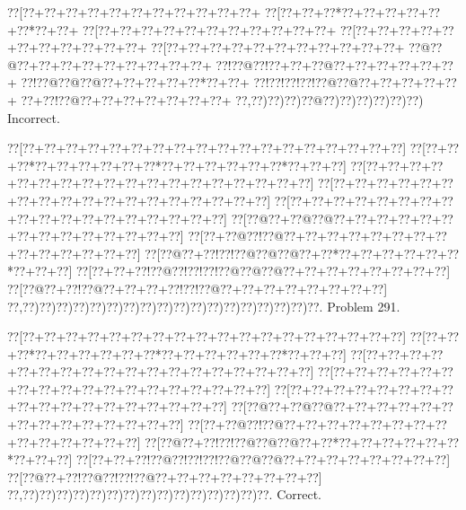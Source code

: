 \documentclass[a5paper]{article}
\begin{document}
\begin{center}
{\goo
\0??[\0??+\0??+\0??+\0??+\0??+\0??+\0??+\0??+\0??+\0??+\0??+
\0??[\0??+\0??+\0??*\0??+\0??+\0??+\0??+\0??+\0??*\0??+\0??+
\0??[\0??+\0??+\0??+\0??+\0??+\0??+\0??+\0??+\0??+\0??+\0??+
\0??[\0??+\0??+\0??+\0??+\0??+\0??+\0??+\0??+\0??+\0??+\0??+
\0??[\0??+\0??+\0??+\0??+\0??+\0??+\0??+\0??+\0??+\0??+\0??+
\0??@\0??@\0??+\0??+\0??+\0??+\0??+\0??+\0??+\0??+\0??+
\0??!\0??@\0??!\0??+\0??+\0??@\0??+\0??+\0??+\0??+\0??+\0??+
\0??!\0??@\0??@\0??@\0??+\0??+\0??+\0??+\0??*\0??+\0??+
\0??!\0??!\0??!\0??!\0??@\0??@\0??+\0??+\0??+\0??+\0??+
\0??+\0??!\0??@\0??+\0??+\0??+\0??+\0??+\0??+\0??+
\0??,\0??)\0??)\0??)\0??@\0??)\0??)\0??)\0??)\0??)\0??)
}
Incorrect. 

\end{center}
\newpage
\begin{center}
{\goo
\0??[\0??+\0??+\0??+\0??+\0??+\0??+\0??+\0??+\0??+\0??+\0??+\0??+\0??+\0??+\0??+\0??+\0??+\0??]
\0??[\0??+\0??+\0??*\0??+\0??+\0??+\0??+\0??+\0??*\0??+\0??+\0??+\0??+\0??+\0??*\0??+\0??+\0??]
\0??[\0??+\0??+\0??+\0??+\0??+\0??+\0??+\0??+\0??+\0??+\0??+\0??+\0??+\0??+\0??+\0??+\0??+\0??]
\0??[\0??+\0??+\0??+\0??+\0??+\0??+\0??+\0??+\0??+\0??+\0??+\0??+\0??+\0??+\0??+\0??+\0??+\0??]
\0??[\0??+\0??+\0??+\0??+\0??+\0??+\0??+\0??+\0??+\0??+\0??+\0??+\0??+\0??+\0??+\0??+\0??+\0??]
\0??[\0??@\0??+\0??@\0??@\0??+\0??+\0??+\0??+\0??+\0??+\0??+\0??+\0??+\0??+\0??+\0??+\0??+\0??]
\0??[\0??+\0??@\0??!\0??@\0??+\0??+\0??+\0??+\0??+\0??+\0??+\0??+\0??+\0??+\0??+\0??+\0??+\0??]
\0??[\0??@\0??+\0??!\0??!\0??@\0??@\0??@\0??+\0??*\0??+\0??+\0??+\0??+\0??+\0??*\0??+\0??+\0??]
\0??[\0??+\0??+\0??!\0??@\0??!\0??!\0??!\0??@\0??@\0??@\0??+\0??+\0??+\0??+\0??+\0??+\0??+\0??]
\0??[\0??@\0??+\0??!\0??@\0??+\0??+\0??+\0??!\0??!\0??@\0??+\0??+\0??+\0??+\0??+\0??+\0??+\0??]
\0??,\0??)\0??)\0??)\0??)\0??)\0??)\0??)\0??)\0??)\0??)\0??)\0??)\0??)\0??)\0??)\0??)\0??)\0??.
}
Problem 291.

\end{center}
\begin{center}
{\goo
\0??[\0??+\0??+\0??+\0??+\0??+\0??+\0??+\0??+\0??+\0??+\0??+\0??+\0??+\0??+\0??+\0??+\0??+\0??]
\0??[\0??+\0??+\0??*\0??+\0??+\0??+\0??+\0??+\0??*\0??+\0??+\0??+\0??+\0??+\0??*\0??+\0??+\0??]
\0??[\0??+\0??+\0??+\0??+\0??+\0??+\0??+\0??+\0??+\0??+\0??+\0??+\0??+\0??+\0??+\0??+\0??+\0??]
\0??[\0??+\0??+\0??+\0??+\0??+\0??+\0??+\0??+\0??+\0??+\0??+\0??+\0??+\0??+\0??+\0??+\0??+\0??]
\0??[\0??+\0??+\0??+\0??+\0??+\0??+\0??+\0??+\0??+\0??+\0??+\0??+\0??+\0??+\0??+\0??+\0??+\0??]
\0??[\0??@\0??+\0??@\0??@\0??+\0??+\0??+\0??+\0??+\0??+\0??+\0??+\0??+\0??+\0??+\0??+\0??+\0??]
\0??[\0??+\0??@\0??!\0??@\0??+\0??+\0??+\0??+\0??+\0??+\0??+\0??+\0??+\0??+\0??+\0??+\0??+\0??]
\0??[\0??@\0??+\0??!\0??!\0??@\0??@\0??@\0??+\0??*\0??+\0??+\0??+\0??+\0??+\0??*\0??+\0??+\0??]
\0??[\0??+\0??+\0??!\0??@\0??!\0??!\0??!\0??@\0??@\0??@\0??+\0??+\0??+\0??+\0??+\0??+\0??+\0??]
\0??[\0??@\0??+\0??!\0??@\0??!\0??!\0??@\0??+\0??+\0??+\0??+\0??+\0??+\0??+\0??]
\0??,\0??)\0??)\0??)\0??)\0??)\0??)\0??)\0??)\0??)\0??)\0??)\0??)\0??)\0??)\0??.
}
Correct. 

\end{center}
\end{document}
